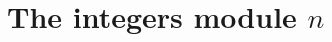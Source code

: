 \documentclass[11pt,a4paper]{article}
\begin{document}
\def\contador{3}



\section{The integers module $n$}
\end{document}
